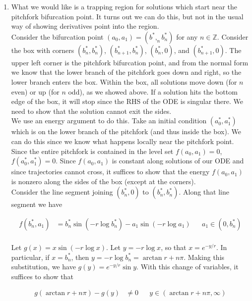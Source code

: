 \documentclass[12pt]{article}
\def\Z{{\mathbb Z}}
\begin{document}
\begin{enumerate}
\item What we would like is a trapping region for solutions which start near the pitchfork bifurcation point. It turns out we can do this, but not in the usual way of showing derivatives point into the region.\\

Consider the bifurcation point $(a_0,a_1) = (b^*,_n b^*_n)$ for any $n \in \Z$. Consider the box with corners $(b^*_n, b^*_n)$, $(b^*_{n+1}, b^*_n)$, $(b^*_n, 0)$, and $(b^*_{n+1}, 0)$. The upper left corner is the pitchfork bifurcation point, and from the normal form we know that the lower branch of the pitchfork goes down and right, so the lower branch enters the box. Within the box, all solutions move down (for $n$ even) or up (for $n$ odd), as we showed above. If a solution hits the bottom edge of the box, it will stop since the RHS of the ODE is singular there. We need to show that the solution cannot exit the sides.\\

We use an energy argument to do this. Take an initial condition $(a_0^*, a_1^*)$ which is on the lower branch of the pitchfork (and thus inside the box). We can do this since we know what happens locally near the pitchfork point. Since the entire pitchfork is contained in the level set $f(a_0, a_1) = 0$, $f(a_0^*, a_1^*) = 0$. Since $f(a_0, a_1)$ is constant along solutions of our ODE and since trajectories cannot cross, it suffices to show that the energy $f(a_0, a_1)$ is nonzero along the sides of the box (except at the corners).\\

Consider the line segment joining $(b^*_n, 0)$ to $(b^*_n, b^*_n)$. Along that line segment we have 

\begin{align*}
f(b^*_n, a_1) &= b^*_n \sin(-r \log b^*_n) - a_1 \sin(-r \log a_1) && a_1 \in (0, b^*_n)\\
\end{align*}

Let $g(x) = x \sin(-r \log x)$. Let $y = -r \log x$, so that $x = e^{-y/r}$. In particular, if $x = b^*_n$, then $y = -r \log b^*_n = \arctan r + n \pi$. Making this substitution, we have $g(y) = e^{-y/r} \sin y$. With this change of variables, it suffices to show that

\begin{align*}
g(\arctan r + n \pi) - g(y) &\neq 0 && y \in (\arctan r + n \pi, \infty) 
\end{align*}


\end{enumerate}
\end{document}
